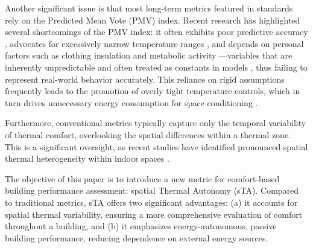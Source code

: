Another significant issue is that most long-term metrics featured in standards rely on the Predicted Mean Vote (PMV) index. Recent research has highlighted several shortcomings of the PMV index: it often exhibits poor predictive accuracy \citep{cheung_analysis_2019}, advocates for excessively narrow temperature ranges \citep{arens_are_2010}, and depends on personal factors such as clothing insulation and metabolic activity \citep{gauthier_role_2013}—variables that are inherently unpredictable and often treated as constants in models \citep{carlucci_review_2012}, thus failing to represent real-world behavior accurately. This reliance on rigid assumptions frequently leads to the promotion of overly tight temperature controls, which in turn drives unnecessary energy consumption for space conditioning \citep{fukawa_field_2021, sekhar_thermal_2016}.

Furthermore, conventional metrics typically capture only the temporal variability of thermal comfort, overlooking the spatial differences within a thermal zone. This is a significant oversight, as recent studies have identified pronounced spatial thermal heterogeneity within indoor spaces \citep{mishra_thermal_2016, kramer_personal_2023}.

The objective of this paper is to introduce a new metric for comfort-based building performance assessment: spatial Thermal Autonomy (sTA). Compared to traditional metrics, sTA offers two significant advantages: (a) it accounts for spatial thermal variability, ensuring a more comprehensive evaluation of comfort throughout a building, and (b) it emphasizes energy-autonomous, passive building performance, reducing dependence on external energy sources.




